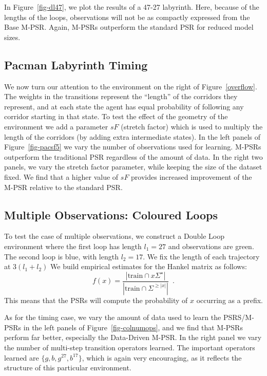 \documentclass[letterpaper]{article}
\newcommand{\sstar}{\Sigma^\star}
\begin{document}
In Figure~\ref{fig-dl47}, we plot the results of a 47-27 labyrinth.  Here, because of the lengths of the loops, observations will not be as compactly expressed from the Base M-PSR. Again, M-PSRs outperform the standard PSR for reduced model sizes.

\subsection{Pacman Labyrinth Timing}

We now turn our attention to the environment on the right of Figure~\ref{overflow}. The weights in the transitions represent the ``length'' of the corridors they represent, and at each state the agent has equal probability of following any corridor starting in that state. To test the effect of the geometry of the environment we add a parameter $sF$ (stretch factor) which is used to multiply the length of the corridors (by adding extra intermediate states). In the left panels of Figure~\ref{fig-pacsf5} we vary the number of observations used for learning. M-PSRs outperform the traditional PSR regardless of the amount of data.  In the right two panels, we vary the stretch factor parameter, while  keeping the size of the dataset fixed. We find that a higher value of $sF$ provides increased improvement of the M-PSR relative to the standard PSR.

\subsection{Multiple Observations: Coloured Loops}

To test the case of multiple observations, we construct a Double Loop environment where the first loop has length $l_1=27$ and observations are green. The second loop is blue, with length $l_2=17$. We fix the length of each trajectory at 
$3 (l_1 + l_2)$
We build empirical estimates for the Hankel matrix as follows:
\begin{equation*}
f(x) = \frac{|\mathrm{train} \cap x \sstar |}{|\mathrm{train} \cap \Sigma^{\geq |x|}|} \enspace.
\end{equation*}  
This means that the PSRs will compute the probability of $x$ occurring as a prefix.

As for the timing case, we vary the amount of data used to  learn the PSRS/M-PSRs in the left panels of Figure~\ref{fig-colnumops}, and we find that M-PSRs perform far better, especially the Data-Driven M-PSR. In the right panel we vary the number of multi-step transition operators learned. The important operators learned are $\{g,b,g^{27},b^{17}\}$, which is again very encouraging, as it reflects the structure of this particular environment.
\end{document}
